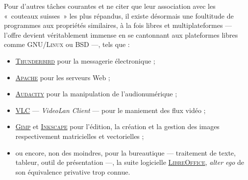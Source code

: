 Pour d'autres tâches courantes et ne citer que leur association avec les «~couteaux suisses~» les plus répandus, il existe désormais une foultitude de programmes aux propriétés similaires, à la fois libres et multiplateformes --- l'offre devient véritablement immense en se cantonnant aux plateformes libres comme \textsc{\gls{GNU/Linux}} ou \textsc{\gls{BSD}}  ---, tels que :
\begin{itemize}
	\item \href{https://www.thunderbird.net/fr/}{\textsc{Thunderbird}} pour la messagerie électronique ;
	\item \href{https://httpd.apache.org/}{\textsc{Apache}} pour les serveurs Web ;
	\item \href{https://www.audacityteam.org/}{\textsc{Audacity}} pour la manipulation de l'audionumérique ;
	\item \href{https://www.videolan.org/}{VLC} --- \textit{VideoLan Client} --- pour le maniement des flux vidéo ;
	\item \href{https://www.gimp.org/}{\textsc{Gimp}} et \href{https://inkscape.org/fr/}{\textsc{Inkscape}} pour l'édition, la création et la gestion des ima\-ges respectivement matricielles et vectorielles ;
	\item ou encore, non des moindres, pour la bureautique --- traitement de texte, tableur, outil de présentation ---, la suite logicielle \href{https://fr.libreoffice.org/}{\textsc{LibreOffice}}, \textit{alter ego} de son équivalence privative trop connue.
\end{itemize}


